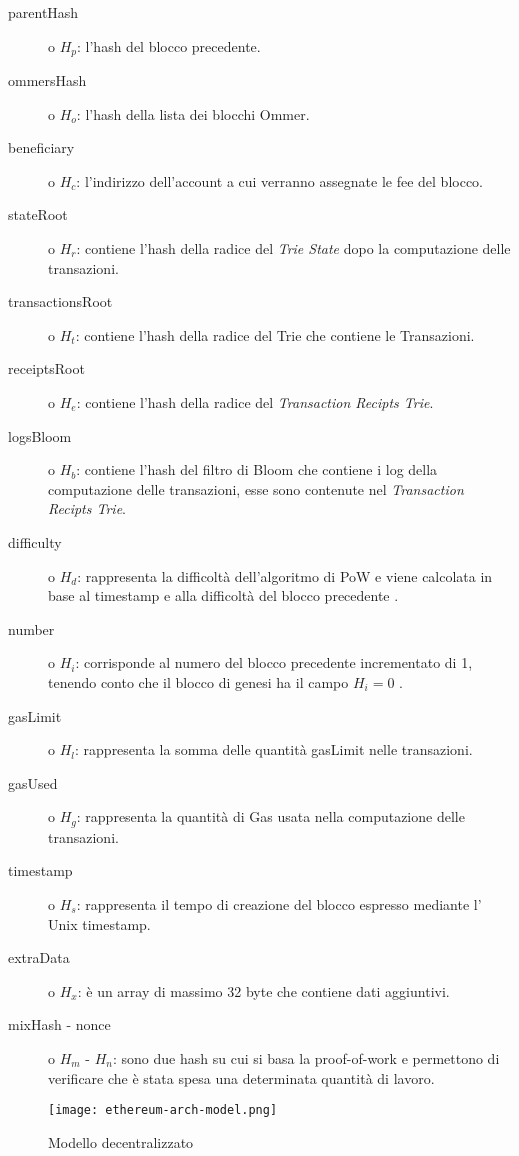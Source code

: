	\begin{description}
		\item[parentHash] o $H_p$: l'hash del blocco precedente.
		\item[ommersHash] o $H_o$: l'hash della lista dei blocchi Ommer.
		\item[beneficiary] o $H_c$: l'indirizzo dell'account a cui verranno assegnate le fee del blocco.
		\item[stateRoot] o $H_r$: contiene l'hash della radice del \textit{Trie State} dopo la computazione delle transazioni.
		\item[transactionsRoot] o $H_t$: contiene l'hash della radice del Trie che contiene le Transazioni.
		\item[receiptsRoot] o $H_e$: contiene l'hash della radice del \textit{Transaction Recipts Trie}.
		\item[logsBloom] o $H_b$: contiene l'hash del filtro di Bloom che contiene i log della computazione delle transazioni, esse sono contenute nel \textit{Transaction Recipts Trie}.
		\item[difficulty] o $H_d$: rappresenta la difficoltà dell'algoritmo di PoW e viene calcolata in base al timestamp e alla difficoltà del blocco precedente .
		\item[number] o $H_i$: corrisponde al numero del blocco precedente incrementato di 1, tenendo conto che il blocco di genesi ha il campo $H_i = 0$ .
		\item[gasLimit] o $H_l$: rappresenta la somma delle quantità gasLimit nelle transazioni.
		\item[gasUsed] o $H_g$: rappresenta la quantità di Gas usata nella computazione delle transazioni.
		\item[timestamp] o $H_s$: rappresenta il tempo di creazione del blocco espresso mediante l' Unix timestamp.
		\item[extraData] o $H_x$: è un array di massimo 32 byte che contiene dati aggiuntivi.
		\item[mixHash - nonce] o $H_m$ - $H_n$: sono due hash su cui si basa la proof-of-work e permettono di verificare che è stata spesa una determinata quantità di lavoro.
	\end{description}

	\begin{figure}
		\label{fig:ethereum-arc-model}
		\caption{Modello decentralizzato}
		\centering
		\texttt{[image: ethereum-arch-model.png]}
	\end{figure}
	
